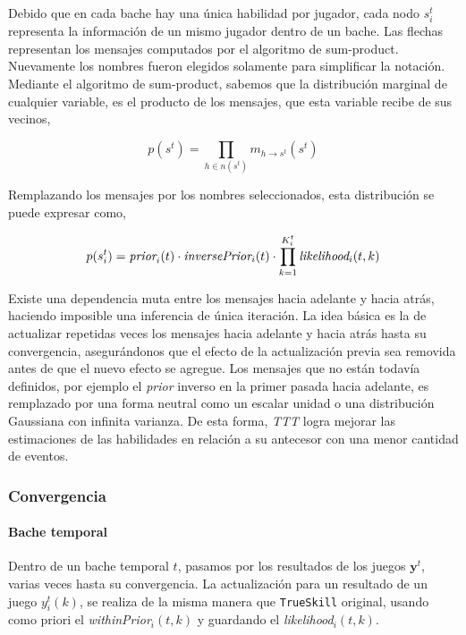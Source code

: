 \documentclass[11pt,twoside, spanish]{report} %
\newcommand{\vm}[1]{\mathbf{#1}}
\begin{document}
Debido que en cada bache hay una \'unica habilidad por jugador, cada nodo $s_i^t$ representa la informaci\'on de un mismo jugador dentro de un bache.
Las flechas representan los mensajes computados por el algoritmo de sum-product.
Nuevamente los nombres fueron elegidos solamente para simplificar la notaci\'on.
Mediante el algoritmo de sum-product, sabemos que la distribuci\'on marginal de cualquier variable, es el producto de los mensajes, que esta variable recibe de sus vecinos,

\begin{equation}
p(s^t) = \prod_{h \in n(s^t)} m_{h \rightarrow s^t}(s^t)
\end{equation}

Remplazando los mensajes por los nombres seleccionados, esta distribuci\'on se puede expresar como,

\begin{equation}
p(s_i^t) = \emph{prior}_i(t) \cdot \emph{inversePrior}_i(t) \cdot \prod_{k=1}^{K_i^t} \emph{likelihood}_i(t,k)
\end{equation}

Existe una dependencia muta entre los mensajes hacia adelante y hacia atr\'as, haciendo imposible una inferencia de \'unica iteraci\'on.
La idea b\'asica es la de actualizar repetidas veces los mensajes hacia adelante y hacia atr\'as hasta su convergencia, asegur\'andonos que el efecto de la actualizaci\'on previa sea removida antes de que el nuevo efecto se agregue.
Los mensajes que no est\'an todav\'ia definidos, por ejemplo el \textit{prior} inverso en la primer pasada hacia adelante, es remplazado por una forma neutral como un escalar unidad o una distribuci\'on Gaussiana con infinita varianza.
De esta forma, \textit{TTT} logra mejorar las estimaciones de las habilidades en relaci\'on a su antecesor con una menor cantidad de eventos.

\subsubsection{Convergencia}

\paragraph{Bache temporal} Dentro de un bache temporal $t$, pasamos por los resultados de los juegos $\vm{y}^t$, varias veces hasta su convergencia.
La actualizaci\'on para un resultado de un juego $y^t_i(k)$, se realiza de la misma manera que \texttt{TrueSkill} original, usando como priori el \emph{withinPrior}$_i(t,k)$ y guardando el \emph{likelihood}$_i(t,k)$.
\end{document}
